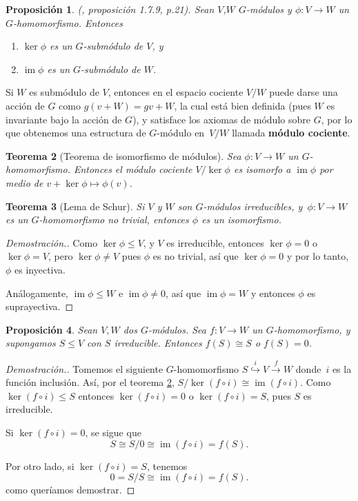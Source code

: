 \documentclass[12pt]{book}
\newtheorem{theorem}{Teorema}[section]
\newtheorem{proposition}[theorem]{Proposición}
\theoremstyle{definition}
\DeclareMathOperator{\im}{im}
\newcounter{in}
\newcounter{ini}
\begin{document}
\begin{proposition}{\normalfont (\cite{sagan2001symmetric}, proposición 1.7.9, p.21)}.
  \label{ker-im-sub}
  Sean $V$,$W$ $G$-módulos y $\phi:V\rightarrow W$ un $G$-homomorfismo. Entonces
  \begin{enumerate}
  \item $\ker\phi$ es un $G$-submódulo de $V$, y
  \item $\im\phi$ es un $G$-submódulo de $W$.
  \end{enumerate}
\end{proposition}  
Si $W$ es submódulo de $V$, entonces en el espacio cociente
$V/W$ puede darse una acción de $G$ como $g(v+W)=gv+W$, la cual está
bien definida (pues $W$ es invariante bajo la acción de $G$), y
satisface los axiomas de módulo sobre $G$, por lo que obtenemos una
estructura de $G$-módulo en~$V/W$ llamada \textbf{módulo cociente}.

\begin{theorem}[Teorema de isomorfismo de módulos]
  \label{teorema-isomorfismo-mod}
  Sea $\phi:V\rightarrow W$ un $G$-homomorfismo. Entonces el
  módulo cociente $V/\ker\phi$ es isomorfo a $\im\phi$ por medio de
  $v+\ker\phi\mapsto\phi(v)$.
\end{theorem}

\begin{theorem}[Lema de Schur]
  \label{lema-schur}
  Si $V$ y $W$ son $G$-módulos irreducibles, y~$\phi:V\rightarrow W$
  es un $G$-homomorfismo no trivial, entonces $\phi$ es un isomorfismo.
\end{theorem}

\begin{proof}[Demostración.]
  Como $\ker \phi\leq V$, y $V$ es irreducible, entonces $\ker \phi=0$
  o~$\ker\phi=V$, pero  $\ker\phi\neq V$ pues $\phi$ es no trivial,
  así que $\ker \phi=0$ y por lo tanto, $\phi$ es inyectiva. 

  Análogamente, $\im\phi\leq W$ e $\im \phi\neq 0$, así que $\im
  \phi=W$ y entonces $\phi$ es suprayectiva.
\end{proof}

\begin{proposition}
  \label{im-mod-irreducible}
  Sean $V,W$ dos $G$-módulos. Sea $f:V\rightarrow W$ un
  $G$-homomorfismo, y supongamos $S\leq V$ con $S$ irreducible. Entonces $f(S)\cong
  S$ o $f(S)=0$.
\end{proposition}

\begin{proof}[Demostración.]
  Tomemos el siguiente $G$-homomorfismo
  $S\stackrel{i}{\hookrightarrow} V\stackrel{f}{\rightarrow}W$
  donde~$i$ es la función inclusión. Así, por el teorema \ref{teorema-isomorfismo-mod}, $S/\ker(f\circ
  i)\cong\im(f\circ i)$. Como $\ker(f\circ
  i)\leq S$ entonces $\ker(f\circ i)=0$ o $\ker(f\circ i)=S$, pues $S$
  es irreducible.

  Si $\ker(f\circ i)=0$, se sigue que
  $$S\cong S/0\cong\im(f\circ i)=f(S).$$

  Por otro lado, si $\ker(f\circ i)=S$, tenemos
  $$0=S/S\cong\im(f\circ i)=f(S).$$
  como queríamos demostrar.
\end{proof}
\end{document}
